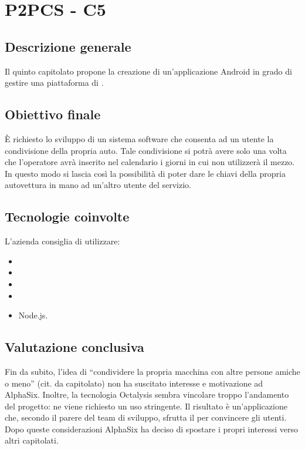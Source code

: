 \section{P2PCS - C5} \label{c5}
    \subsection{Descrizione generale}
    Il quinto capitolato propone la creazione di un'applicazione Android in grado di gestire una piattaforma di 
    .

    \subsection{Obiettivo finale}
    \`E richiesto lo sviluppo di un sistema software che consenta ad un utente la condivisione della propria auto. Tale condivisione si potrà
    avere solo una volta che l'operatore avrà inserito nel calendario i giorni in cui non utilizzerà il mezzo.
    In questo modo si lascia così la possibilità di poter dare le chiavi della propria autovettura in mano ad un'altro utente del servizio.

    \subsection{Tecnologie coinvolte}
    L'azienda consiglia di utilizzare:
        \begin{itemize}
        \item {}
        \item {}
        \item {}
        \item {}
        \item Node.js.
    \end{itemize}

    \subsection{Valutazione conclusiva}
    Fin da subito, l'idea di ``condividere la propria macchina con altre persone amiche o meno'' (cit. da capitolato) non ha suscitato interesse
    e motivazione ad AlphaSix. Inoltre, la tecnologia Octalysis sembra vincolare troppo l'andamento del progetto: ne viene richiesto un
    uso stringente. Il risultato è un'applicazione che, secondo il parere del team di sviluppo, sfrutta il  per convincere gli utenti.
    Dopo queste considerazioni AlphaSix ha deciso di spostare i propri interessi verso altri capitolati.
